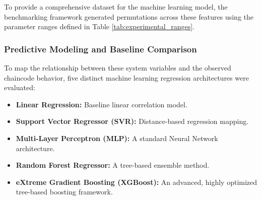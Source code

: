 \documentclass[manuscript,screen]{acmart}
\begin{document}
To provide a comprehensive dataset for the machine learning model, the benchmarking framework generated permutations across these features using the parameter ranges defined in Table \ref{tab:experimental_ranges}.

\begin{table}[ht]
\centering
\caption{Experimental Benchmarking Parameter Ranges}
\label{tab:experimental_ranges}
\end{table}

\subsubsection{Predictive Modeling and Baseline Comparison}

To map the relationship between these system variables and the observed chaincode behavior, five distinct machine learning regression architectures were evaluated:
\begin{itemize}
    \item \textbf{Linear Regression:} Baseline linear correlation model.
    \item \textbf{Support Vector Regressor (SVR):} Distance-based regression mapping.
    \item \textbf{Multi-Layer Perceptron (MLP):} A standard Neural Network architecture.
    \item \textbf{Random Forest Regressor:} A tree-based ensemble method.
    \item \textbf{eXtreme Gradient Boosting (XGBoost):} An advanced, highly optimized tree-based boosting framework.
\end{itemize}
\end{document}
